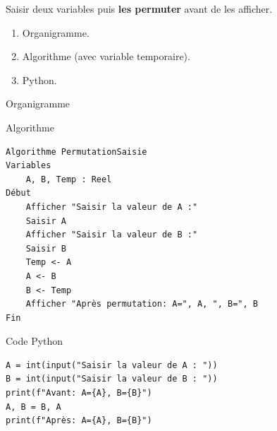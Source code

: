\documentclass[12pt,a4paper]{article}
\begin{document}
\begin{exobox}[title=\textbf{Exercice 4 — Permutation de 2 variables saisies}]
Saisir deux variables puis \textbf{les permuter} avant de les afficher.
\end{exobox}

\begin{taskbox}
\begin{enumerate}
  \item Organigramme.
  \item Algorithme (avec variable temporaire).
  \item Python.
\end{enumerate}
\end{taskbox}

\begin{ansbox}{Organigramme}
\end{ansbox}

\begin{ansbox}{Algorithme}
\begin{verbatim}
Algorithme PermutationSaisie
Variables
    A, B, Temp : Reel
Début
    Afficher "Saisir la valeur de A :"
    Saisir A
    Afficher "Saisir la valeur de B :"
    Saisir B
    Temp <- A
    A <- B
    B <- Temp
    Afficher "Après permutation: A=", A, ", B=", B
Fin
\end{verbatim}
\end{ansbox}

\begin{ansbox}{Code Python}
\begin{verbatim}
A = int(input("Saisir la valeur de A : "))
B = int(input("Saisir la valeur de B : "))
print(f"Avant: A={A}, B={B}")
A, B = B, A
print(f"Après: A={A}, B={B}")
\end{verbatim}
\end{ansbox}
\end{document}
